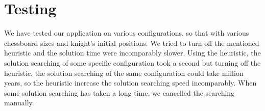 \newpage

\section{Testing}

We have tested our application on various configurations, so that with various chessboard sizes and knight's initial positions. We tried to turn off the mentioned heuristic and the solution time were incomparably slower. Using the heuristic, the solution searching of some specific configuration took a second but turning off the heuristic, the solution searching of the same configuration could take million years, so the heuristic increase the solution searching speed incomparably. When some solution searching has taken a long time, we cancelled the searching manually.